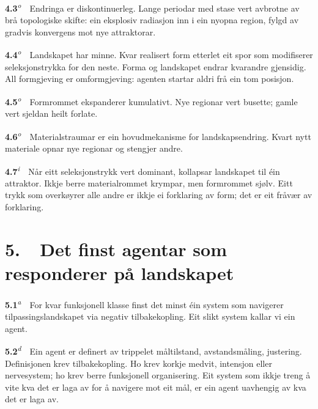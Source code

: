 \documentclass[10pt]{article}
\begin{document}
\noindent\textbf{4.3}\textsuperscript{\textit{o}}~~Endringa er diskontinuerleg. Lange periodar med stase vert avbrotne av brå topologiske skifte: ein eksplosiv radiasjon inn i ein nyopna region, fylgd av gradvis konvergens mot nye attraktorar.




\noindent\textbf{4.4}\textsuperscript{\textit{o}}~~Landskapet har minne. Kvar realisert form etterlet eit spor som modifiserer seleksjonstrykka for den neste. Forma og landskapet endrar kvarandre gjensidig. All formgjeving er omformgjeving: agenten startar aldri frå ein tom posisjon.




\noindent\textbf{4.5}\textsuperscript{\textit{o}}~~Formrommet ekspanderer kumulativt. Nye regionar vert busette; gamle vert sjeldan heilt forlate.




\noindent\textbf{4.6}\textsuperscript{\textit{o}}~~Materialstraumar er ein hovudmekanisme for landskapsendring. Kvart nytt materiale opnar nye regionar og stengjer andre.




\noindent\textbf{4.7}\textsuperscript{\textit{i}}~~Når eitt seleksjonstrykk vert dominant, kollapsar landskapet til éin attraktor. Ikkje berre materialrommet krympar, men formrommet sjølv. Eitt trykk som overkøyrer alle andre er ikkje ei forklaring av form; det er eit fråvær av forklaring.







\chapter*{5.~~Det finst agentar som responderer på landskapet}




\noindent\textbf{5.1}\textsuperscript{\textit{a}}~~For kvar funksjonell klasse finst det minst éin system som navigerer tilpassingslandskapet via negativ tilbakekopling. Eit slikt system kallar vi ein agent.




\noindent\textbf{5.2}\textsuperscript{\textit{d}}~~Ein agent er definert av trippelet måltilstand, avstandsmåling, justering. Definisjonen krev tilbakekopling. Ho krev korkje medvit, intensjon eller nervesystem; ho krev berre funksjonell organisering. Eit system som ikkje treng å vite kva det er laga av for å navigere mot eit mål, er ein agent uavhengig av kva det er laga av.
\end{document}
